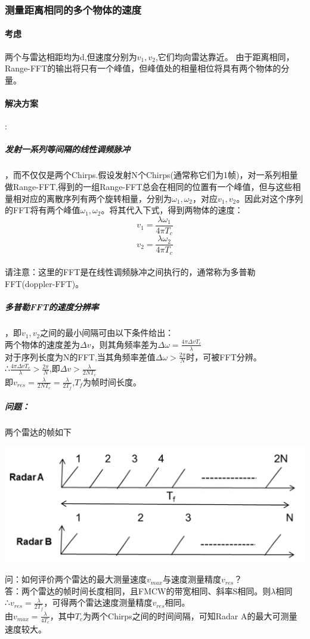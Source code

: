 \documentclass[UTF8]{ctexart}
\begin{document}
\subsubsection{测量距离相同的多个物体的速度}
\paragraph{考虑}两个与雷达相距均为d,但速度分别为$v_1,v_2$,它们均向雷达靠近。
由于距离相同，Range-FFT的输出将只有一个峰值，但峰值处的相量相位将具有两个物体的分量。
\paragraph{解决方案}:
\subparagraph{发射一系列等间隔的线性调频脉冲}，而不仅仅是两个Chirps.假设发射N个Chirps(通常称它们为1帧)，对一系列相量做Range-FFT,得到的一组Range-FFT总会在相同的位置有一个峰值，但与这些相量相对应的离散序列有两个旋转相量，分别为$\omega_1,\omega_2$，对应$v_1,v_2$。因此对这个序列的FFT将有两个峰值$\omega_1,\omega_2$。将其代入下式，得到两物体的速度：\\
\[v_1=\frac{\lambda \omega_1}{4 \pi T_c}\]
\[v_2=\frac{\lambda \omega_2}{4 \pi T_c}\]\\
请注意：这里的FFT是在线性调频脉冲之间执行的，通常称为多普勒FFT(doppler-FFT)。
\subparagraph{多普勒FFT的速度分辨率}，即$v_1,v_2$之间的最小间隔可由以下条件给出：\\
两个物体的速度差为$\Delta v$，则其角频率差为\(\Delta \omega=\frac{4\pi \Delta v T_c}{\lambda}\)\\
对于序列长度为N的FFT,当其角频率差值$\Delta \omega>\frac{2\pi}{N}$时，可被FFT分辨。\\
∴$\frac{4\pi \Delta v T_c}{\lambda}>\frac{2\pi}{N}$,即$\Delta v > \frac{\lambda}{2NT_c}$\\
即$v_{res}=\frac{\lambda}{2NT_c}=\frac{\lambda}{2T_f}$,$T_f$为帧时间长度。\\
\subparagraph{问题：}两个雷达的帧如下

{\centering \includegraphics[width = .4\textwidth]{pic/diffframe.png}

}
问：如何评价两个雷达的最大测量速度$v_{max}$与速度测量精度$v_{res}$？\\
答：两个雷达的帧时间长度相同，且FMCW的带宽相同、斜率S相同。则$\lambda$相同\\
∴$v_{res}=\frac{\lambda}{2T_f}$，可得两个雷达速度测量精度$v_{res}$相同。\\
由$v_{max}=\frac{\lambda}{4T_c}$，其中$T_c$为两个Chirps之间的时间间隔，可知Radar A的最大可测量速度较大。
\end{document}
